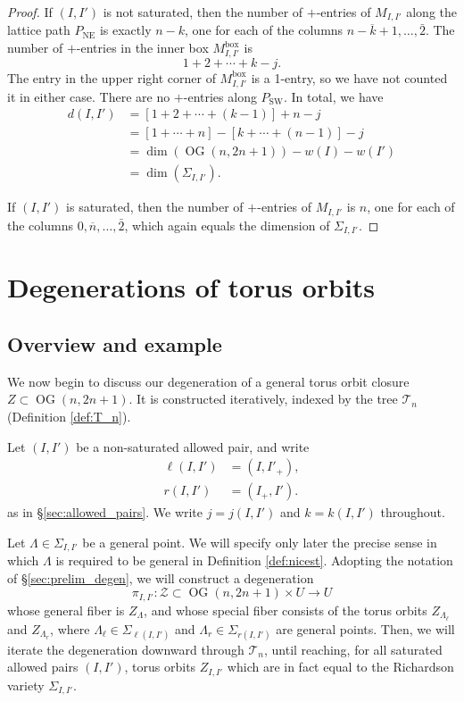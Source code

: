 \documentclass[12pt]{amsart}
\DeclareMathOperator{\inbox}{box}
\DeclareMathOperator{\NE}{NE}
\DeclareMathOperator{\OG}{OG}
\DeclareMathOperator{\SW}{SW}
\newcommand{\cT}{\mathcal{T}}
\newcommand{\cZ}{\mathcal{Z}}
\newcommand{\barn}{\overline{n}}
\begin{document}
\begin{proof}
If $(I,I')$ is not saturated, then the number of $+$-entries of $M_{I,I'}$ along the lattice path $P_{\NE}$ is exactly $n-k$, one for each of the columns $\overline{n-k+1},\ldots,\bar2$. The number of $+$-entries in the inner box $M_{I,I'}^{\inbox}$ is
\begin{equation*}
    1+2+\cdots+k-j.
\end{equation*}
The entry in the upper right corner of $M_{I,I'}^{\inbox}$ is a 1-entry, so we have not counted it in either case. There are no $+$-entries along $P_{\SW}$. In total, we have 
\begin{align*}
    d(I,I')&=[1+2+\cdots+(k-1)]+n-j\\
    &=[1+\cdots+n]-[k+\cdots+(n-1)]-j\\
    &=\dim(\OG(n,2n+1))-w(I)-w(I')\\
    &=\dim(\Sigma_{I,I'}).
\end{align*}

If $(I,I')$ is saturated, then the number of $+$-entries of $M_{I,I'}$ is $n$, one for each of the columns $0,\barn,\ldots,\bar2$, which again equals the dimension of $\Sigma_{I,I'}$.
\end{proof}

\section{Degenerations of torus orbits}\label{sec:degen}

\subsection{Overview and example}\label{sec:degen_overview}

We now begin to discuss our degeneration of a general torus orbit closure $Z\subset\OG(n,2n+1)$. It is constructed iteratively, indexed by the tree $\cT_n$ (Definition \ref{def:T_n}).

Let $(I,I')$ be a non-saturated allowed pair, and write
\begin{align*}
    \ell(I,I')&=(I,I'_+),\\
    r(I,I')&=(I_+,I').
\end{align*}
as in \S\ref{sec:allowed_pairs}. We write $j=j(I,I')$ and $k=k(I,I')$ throughout.

Let $\Lambda\in\Sigma_{I,I'}$ be a general point. We will specify only later the precise sense in which $\Lambda$ is required to be general in Definition \ref{def:nicest}. Adopting the notation of \S\ref{sec:prelim_degen}, we will construct a degeneration
\begin{equation*}
    \pi_{I,I'}:\cZ\subset\OG(n,2n+1)\times U\to U
\end{equation*}
whose general fiber is $Z_{\Lambda}$, and whose special fiber consists of the torus orbits $Z_{\Lambda_\ell}$ and $Z_{\Lambda_r}$, where $\Lambda_\ell\in \Sigma_{\ell(I,I')}$ and $\Lambda_r\in \Sigma_{r(I,I')}$ are general points. Then, we will iterate the degeneration downward through $\cT_n$, until reaching, for all saturated allowed pairs $(I,I')$, torus orbits $Z_{I,I'}$ which are in fact equal to the Richardson variety $\Sigma_{I,I'}$.
\end{document}
